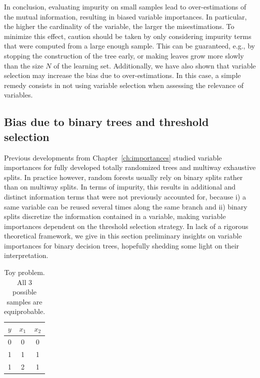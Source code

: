 In conclusion, evaluating impurity on small samples lead to over-estimations of
the mutual information, resulting in biased variable importances. In
particular, the higher the cardinality of the variable,  the larger the
misestimations. To minimize this effect, caution should be taken by only
considering impurity terms that were computed from a large enough sample. This
can be guaranteed, e.g., by stopping the construction of the tree early, or
making leaves grow more slowly than the size $N$ of the learning set.
Additionally, we have also shown that variable selection may increase the bias
due to over-estimations. In this case, a simple remedy consists in not using
variable selection when assessing the relevance of variables.

\subsection{Bias due to binary trees and threshold selection}
\label{sec:bias:tree}

Previous developments from Chapter~\ref{ch:importances} studied variable
importances for fully developed totally randomized trees and multiway
exhaustive splits. In practice however, random forests usually rely on binary
splits rather than on multiway splits. In terms of impurity, this results in
additional and distinct information terms that were not previously accounted
for, because i) a same variable can be reused several times along the same
branch and ii) binary splits discretize the information contained in a
variable, making variable importances dependent on the threshold selection
strategy. In lack of a rigorous theoretical framework, we give in this section
preliminary insights on variable importances for binary decision trees,
hopefully shedding some light on their interpretation.

\begin{table}
    \centering
    \begin{tabular}{| c | c c |}
    \hline
    $y$ & $x_1$ & $x_2$ \\
    \hline
    \hline
    0 & 0 & 0 \\
    1 & 1 & 1 \\
    1 & 2 & 1 \\
    \hline
    \end{tabular}
    \caption{Toy problem. All $3$ possible samples are equiprobable.}
    \label{table:simulation:bias:tree}
\end{table}

